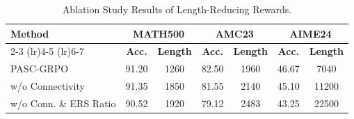 \begin{table}[htbp]
    \centering
    \normalsize %
    \caption{Ablation Study Results of Length-Reducing Rewards.}
    \label{tab:ablation_length}
    \renewcommand{\arraystretch}{1} %
    \begin{tabular}{lcccccc}
        \toprule
        \multirow{2}{*}{\textbf{Method}} & \multicolumn{2}{c}{\textbf{MATH500}} & \multicolumn{2}{c}{\textbf{AMC23}} & \multicolumn{2}{c}{\textbf{AIME24}} \\
        \cmidrule(lr){2-3} \cmidrule(lr){4-5} \cmidrule(lr){6-7}
        & \textbf{Acc.} & \textbf{Length} & \textbf{Acc.} & \textbf{Length} & \textbf{Acc.} & \textbf{Length} \\
        \midrule
        PASC-GRPO                & 91.20 & 1260 & 82.50 & 1960 & 46.67 & 7040 \\
        w/o Connectivity         & 91.35 & 1850 & 81.55 & 2140 & 45.10 & 11200 \\
        w/o Conn. \& ERS Ratio & 90.52 & 1920 & 79.12 & 2483 & 43.25 & 22500 \\
        \bottomrule
    \end{tabular}
\end{table}

